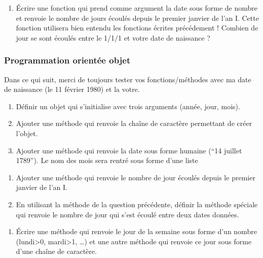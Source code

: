 \documentclass[letterpaper,10pt,english]{sphinxhowto}
\begin{document}
\begin{enumerate}
%
\setcounter{enumi}{4}
\item {} 
\sphinxAtStartPar
Écrire une fonction qui prend comme argument la date sous forme de nombre et renvoie le nombre de jours écoulés depuis le premier janvier de l’an I. Cette fonction utilisera bien entendu les fonctions écrites précédement ! Combien de jour se sont écoulés entre le 1/1/1 et votre date de naissance ?

\end{enumerate}


\subsubsection{Programmation orientée objet}
\label{\detokenize{devoir_maison_Devoir Maison:programmation-orientee-objet}}
\sphinxAtStartPar
Dans ce qui suit, merci de toujours tester vos fonctions/méthodes avec ma date de naissance (le 11 février 1980) et la votre.
\begin{enumerate}
%
\setcounter{enumi}{4}
\item {} 
\sphinxAtStartPar
Définir un objet  qui s’initialise avec trois arguments (année, jour, mois).

\item {} 
\sphinxAtStartPar
Ajouter une méthode  qui renvoie la chaîne de caractère permettant de créer l’objet.

\item {} 
\sphinxAtStartPar
Ajouter une méthode  qui renvoie la date sous forme humaine (“14 juillet 1789”). Le nom des mois sera rentré sous forme d’une liste

\end{enumerate}
\begin{enumerate}
%
\setcounter{enumi}{7}
\item {} 
\sphinxAtStartPar
Ajouter une méthode qui renvoie le nombre de jour écoulés depuis le premier janvier de l’an I.

\item {} 
\sphinxAtStartPar
En utilisant la méthode de la question précédente, définir la méthode spéciale  qui renvoie le nombre de jour qui s’est écoulé entre deux dates données.

\end{enumerate}
\begin{enumerate}
%
\setcounter{enumi}{9}
\item {} 
\sphinxAtStartPar
Écrire une méthode qui renvoie le jour de la semaine sous forme d’un nombre (lundi\sphinxhyphen{}>0, mardi\sphinxhyphen{}>1, …) et une autre méthode qui renvoie ce jour sous forme d’une chaîne de caractère.

\end{enumerate}
\end{document}
